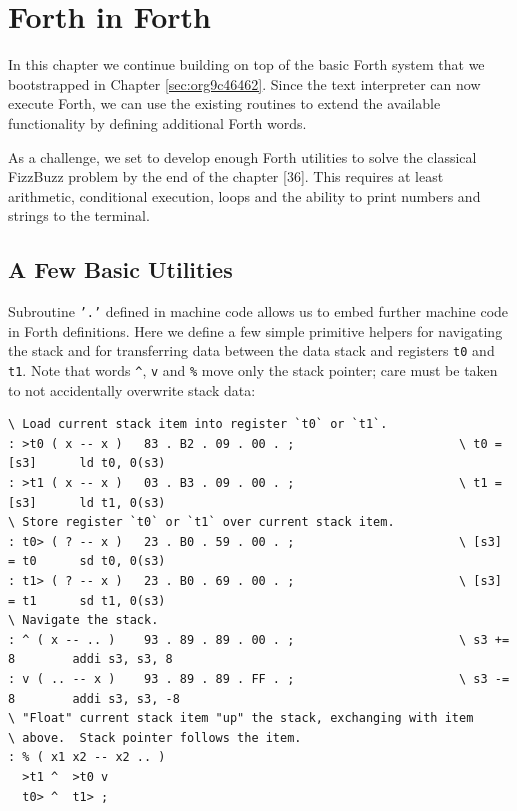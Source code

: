 \documentclass[a4paper,12pt,final]{article}
\makeatletter
\newcommand{\citeprocitem}[2]{\hyper@linkstart{cite}{citeproc_bib_item_#1}#2\hyper@linkend}
\makeatother
\begin{document}
\clearpage


\section{Forth in Forth}
\label{sec:org2f0b45c}

In this chapter we continue building on top of the basic Forth system
that we bootstrapped in Chapter \ref{sec:org9c46462}.  Since
the text interpreter can now execute Forth, we can use the existing
routines to extend the available functionality by defining additional
Forth words.

As a challenge, we set to develop enough Forth utilities to solve the
classical FizzBuzz problem by the end of the chapter
\citeprocitem{36}{[36]}.  This requires at least arithmetic, conditional
execution, loops and the ability to print numbers and strings to the
terminal.

\subsection{A Few Basic Utilities}
\label{sec:org4d31794}

Subroutine \texttt{'.'} defined in machine code allows us to embed further
machine code in Forth definitions.  Here we define a few simple
primitive helpers for navigating the stack and for transferring data
between the data stack and registers \texttt{t0} and \texttt{t1}.  Note that words
\texttt{\textasciicircum{}}, \texttt{v} and \texttt{\%} move only the stack pointer; care must be taken to
not accidentally overwrite stack data:

\fontsize{9pt}{9.000000pt}\selectfont
\begin{verbatim}
\ Load current stack item into register `t0` or `t1`.
: >t0 ( x -- x )   83 . B2 . 09 . 00 . ;                       \ t0 = [s3]      ld t0, 0(s3)
: >t1 ( x -- x )   03 . B3 . 09 . 00 . ;                       \ t1 = [s3]      ld t1, 0(s3)
\ Store register `t0` or `t1` over current stack item.
: t0> ( ? -- x )   23 . B0 . 59 . 00 . ;                       \ [s3] = t0      sd t0, 0(s3)
: t1> ( ? -- x )   23 . B0 . 69 . 00 . ;                       \ [s3] = t1      sd t1, 0(s3)
\ Navigate the stack.
: ^ ( x -- .. )    93 . 89 . 89 . 00 . ;                       \ s3 += 8        addi s3, s3, 8
: v ( .. -- x )    93 . 89 . 89 . FF . ;                       \ s3 -= 8        addi s3, s3, -8
\ "Float" current stack item "up" the stack, exchanging with item
\ above.  Stack pointer follows the item.
: % ( x1 x2 -- x2 .. )
  >t1 ^  >t0 v
  t0> ^  t1> ;
\end{verbatim}
\normalsize
\end{document}
